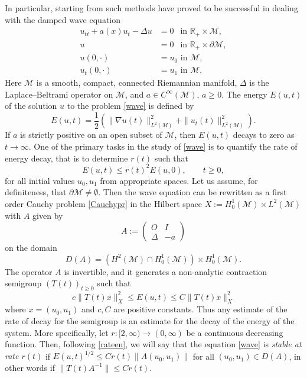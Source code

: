 \documentclass[11pt]{amsart}
\theoremstyle{definition}
\theoremstyle{remark}
\numberwithin{equation}{section}
\begin{document}
In particular, starting from \cite{Le96} such methods have proved
to be successful in dealing with the damped wave equation
\begin{equation} \label{wave}
\begin{split}
 u_{tt} + a(x) u_t -\Delta u &= 0 \;\,\text{ in } {{\mathbb R}}_+ \times
 \mathcal M,\\
 u & = 0 \;\,\text{ in } {{\mathbb R}}_+ \times \partial \mathcal M , \\
 u(0,\cdot ) & = u_0 \text{ in } \mathcal M , \\
 u_t (0,\cdot ) & = u_1 \text{ in } \mathcal M ,
\end{split}
\end{equation}
Here $\mathcal M$ is a smooth, compact, connected Riemannian
manifold, $\Delta$ is the Laplace--Beltrami operator on $\mathcal
M$,  and $a \in C^{\infty}(\mathcal M)$, $a \geq 0$. The energy
$E(u,t)$ of the solution $u$ to the problem \eqref{wave} is
defined by
\begin{equation*}
E(u,t)=\frac{1}{2}\left(\|\nabla u(t)\|^2_{L^2(M)}+\|u_t(t)\|^2_{L^2(M)}\right).
\end{equation*}
If  $a$ is strictly positive on an open subset of $\mathcal M$,
then $E(u,t)$  decays to zero as $t \to \infty$. One of the
primary tasks in the study of \eqref{wave} is to quantify the rate
of energy decay, that is to determine $r(t)$ such that
\begin{equation}\label{rateen}
E(u,t) \le r(t)^2 E(u,0), \qquad t \ge 0,
\end{equation}
for all initial values $u_0,u_1$ from appropriate spaces. Let us
assume, for definiteness, that $\partial \mathcal M \neq
\emptyset$. Then the wave equation can be rewritten as a first
order Cauchy problem \eqref{Cauchypr} in the Hilbert space $X :=
H^1_0(\mathcal M)\times L^2(\mathcal M)$ with $A$ given  by
\begin{equation}\label{defA1}
A := \begin{pmatrix} O & I\\
                   \Delta & -a\end{pmatrix}
\end{equation}
on the domain
\begin{equation}\label{defA0}
 D(A)= (H^2(\mathcal M)\cap H^1_0(\mathcal M))\times H^1_0(\mathcal
 M).
\end{equation}
 The operator $A$ is invertible, and it generates a
non-analytic contraction semigroup $(T(t))_{t\geq 0}$ such that
$$
c\|T(t) x\|_X^2 \le E(u,t) \le C \|T(t) x\|_X^2
$$
where $x = (u_0,u_1)$ and $c,C$ are positive constants.  Thus any estimate of the rate of decay for
the semigroup is an estimate for the decay of the energy of the
system.  More specifically, let $r : [2,\infty) \to (0,\infty)$ be
a continuous decreasing function.  Then, following \eqref{rateen},
we will say that the equation \eqref{wave} is  {\it stable at rate
$r(t)$} if $E(u,t)^{1/2} \le C r(t) \|A (u_0, u_1)\|$ for all
$(u_0,u_1) \in D(A)$, in other words if $\|T(t)A^{-1}\| \le
Cr(t)$.
\end{document}
